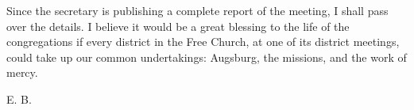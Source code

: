 Since the secretary is publishing a complete report of the meeting, I shall pass over the details. I believe it would be a great blessing to the life of the congregations if every district in the Free Church, at one of its district meetings, could take up our common undertakings: Augsburg, the missions, and the work of mercy.

E. B.
